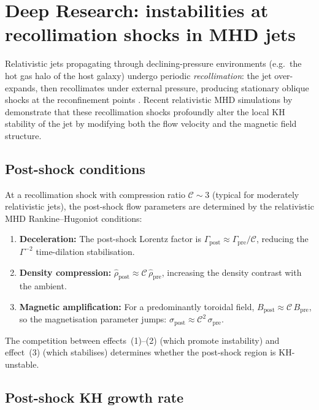 \section{Deep Research: instabilities at recollimation shocks in MHD jets}
\label{sec:rel-11-105-106-recoll}

Relativistic jets propagating through declining-pressure environments
(e.g.\ the hot gas halo of the host galaxy) undergo periodic
\emph{recollimation}: the jet over-expands, then recollimates under
external pressure, producing stationary oblique shocks at the
reconfinement points \cite{GourgouliatosKomissarov2018, Matsumoto2017}.
Recent relativistic MHD simulations by \cite{MukherjeeBodo2025}
demonstrate that these recollimation shocks profoundly alter the
local KH stability of the jet by modifying both the flow velocity
and the magnetic field structure.

\subsection{Post-shock conditions}
\label{sec:rel-11-105-106-recoll-post}

At a recollimation shock with compression ratio $\mathcal{C} \sim 3$
(typical for moderately relativistic jets), the post-shock flow
parameters are determined by the relativistic MHD Rankine--Hugoniot
conditions:
\begin{enumerate}
\item \textbf{Deceleration:} The post-shock Lorentz factor is
  $\Gamma_{\mathrm{post}} \approx \Gamma_{\mathrm{pre}}/\mathcal{C}$,
  reducing the $\Gamma^{-2}$ time-dilation stabilisation.
\item \textbf{Density compression:} $\hat{\rho}_{\mathrm{post}} \approx
  \mathcal{C}\,\hat{\rho}_{\mathrm{pre}}$, increasing the density
  contrast with the ambient.
\item \textbf{Magnetic amplification:} For a predominantly toroidal
  field, $B_{\mathrm{post}} \approx \mathcal{C}\,B_{\mathrm{pre}}$,
  so the magnetisation parameter jumps:
  $\sigma_{\mathrm{post}} \approx \mathcal{C}^{2}\,\sigma_{\mathrm{pre}}$.
\end{enumerate}

The competition between effects~(1)--(2) (which promote instability)
and effect~(3) (which stabilises) determines whether the post-shock
region is KH-unstable.

\subsection{Post-shock KH growth rate}
\label{sec:rel-11-105-106-recoll-growth}

